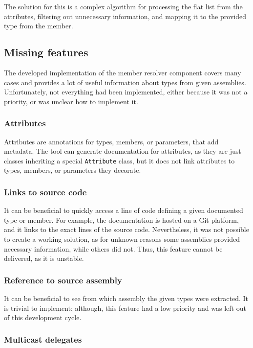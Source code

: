 The solution for this is a complex algorithm for processing the flat list from the attributes, filtering out unnecessary information, and mapping it to the provided type from the member.

\subsection{Missing features}

The developed implementation of the member resolver component covers many cases and provides a lot of useful information about types from given assemblies. Unfortunately, not everything had been implemented, either because it was not a priority, or was unclear how to implement it.

\subsubsection{Attributes}

Attributes are annotations for types, members, or parameters, that add metadata. The tool can generate documentation for attributes, as they are just classes inheriting a special \lstinline[language=csh]{Attribute} class, but it does not link attributes to types, members, or parameters they decorate.

\subsubsection{Links to source code}

It can be beneficial to quickly access a line of code defining a given documented type or member. For example, the documentation is hosted on a Git platform, and it links to the exact lines of the source code. Nevertheless, it was not possible to create a working solution, as for unknown reasons some assemblies provided necessary information, while others did not. Thus, this feature cannot be delivered, as it is unstable.

\subsubsection{Reference to source assembly}

It can be beneficial to see from which assembly the given types were extracted. It is trivial to implement; although, this feature had a low priority and was left out of this development cycle.

\subsubsection{Multicast delegates}

